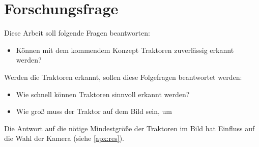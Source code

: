 \section{Forschungsfrage} \label{ch4:questions}
Diese Arbeit soll folgende Fragen beantworten:
\begin{itemize}
    \item Können mit dem kommendem Konzept Traktoren zuverlässig erkannt werden?
\end{itemize}

Werden die Traktoren erkannt, sollen diese Folgefragen beantwortet werden:
\begin{itemize}
    \item Wie schnell können Traktoren sinnvoll erkannt werden?
    \item Wie groß muss der Traktor auf dem Bild sein, um~
\end{itemize}

Die Antwort auf die nötige Mindestgröße der Traktoren im Bild hat Einfluss auf die Wahl der Kamera (siehe \autoref{apx:res}).




